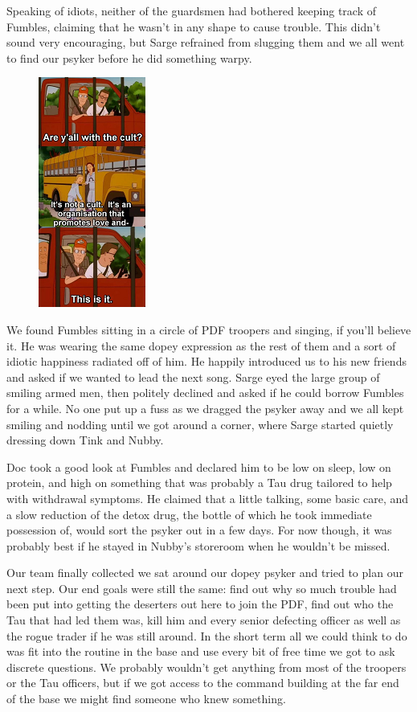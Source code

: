 Speaking of idiots, neither of the guardsmen had bothered keeping track of Fumbles, claiming that he wasn't in any shape to cause trouble. 
This didn't sound very encouraging, but Sarge refrained from slugging them and we all went to find our psyker before he did something warpy.

\begin{figure}
	\begin{center}
		\includegraphics[width=\figwidth]{pics/10/45.png}
	\end{center}
\end{figure}
We found Fumbles sitting in a circle of PDF troopers and singing, if you'll believe it. 
He was wearing the same dopey expression as the rest of them and a sort of idiotic happiness radiated off of him. 
He happily introduced us to his new friends and asked if we wanted to lead the next song. 
Sarge eyed the large group of smiling armed men, then politely declined and asked if he could borrow Fumbles for a while. 
No one put up a fuss as we dragged the psyker away and we all kept smiling and nodding until we got around a corner, where Sarge started quietly dressing down Tink and Nubby.

Doc took a good look at Fumbles and declared him to be low on sleep, low on protein, and high on something that was probably a Tau drug tailored to help with withdrawal symptoms. 
He claimed that a little talking, some basic care, and a slow reduction of the detox drug, the bottle of which he took immediate possession of, would sort the psyker out in a few days. 
For now though, it was probably best if he stayed in Nubby's storeroom when he wouldn't be missed.

Our team finally collected we sat around our dopey psyker and tried to plan our next step. 
Our end goals were still the same: 
find out why so much trouble had been put into getting the deserters out here to join the PDF, find out who the Tau that had led them was, kill him and every senior defecting officer as well as the rogue trader if he was still around. 
In the short term all we could think to do was fit into the routine in the base and use every bit of free time we got to ask discrete questions. 
We probably wouldn't get anything from most of the troopers or the Tau officers, but if we got access to the command building at the far end of the base we might find someone who knew something.


